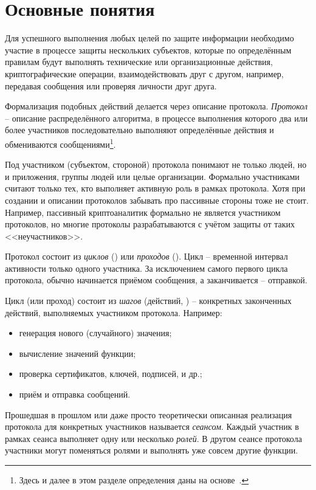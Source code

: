 \section{Основные понятия}
Для успешного выполнения любых целей по защите информации необходимо участие в процессе защиты нескольких субъектов, которые по определённым правилам будут выполнять технические или организационные действия, криптографические операции, взаимодействовать друг с другом, например, передавая сообщения или проверяя личности друг друга.

Формализация подобных действий делается через описание протокола. \emph{Протокол} -- описание распределённого алгоритма, в процессе выполнения которого два или более участников последовательно выполняют определённые действия и обмениваются сообщениями\footnote{Здесь и далее в этом разделе определения даны на основе~\cite{Cheremushkin:2009}.}.

Под участником (субъектом, стороной) протокола понимают не только людей, но и приложения, группы людей или целые организации. Формально участниками считают только тех, кто выполняет активную роль в рамках протокола. Хотя при создании и описании протоколов забывать про пассивные стороны тоже не стоит. Например, пассивный криптоаналитик формально не является участником протоколов, но многие протоколы разрабатываются с учётом защиты от таких <<неучастников>>.

Протокол состоит из \emph{циклов} () или \emph{проходов} (). Цикл -- временной интервал активности только одного участника. За исключением самого первого цикла протокола, обычно начинается приёмом сообщения, а заканчивается -- отправкой.

Цикл (или проход) состоит из \emph{шагов} (действий, ) -- конкретных законченных действий, выполняемых участником протокола. Например:
\begin{itemize}
	\item генерация нового (случайного) значения;
	\item вычисление значений функции;
	\item проверка сертификатов, ключей, подписей, и др.;
	\item приём и отправка сообщений.
\end{itemize}

Прошедшая в прошлом или даже просто теоретически описанная реализация протокола для конкретных участников называется \emph{сеансом}. Каждый участник в рамках сеанса выполняет одну или несколько \emph{ролей}. В другом сеансе протокола участники могут поменяться ролями и выполнять уже совсем другие функции.

